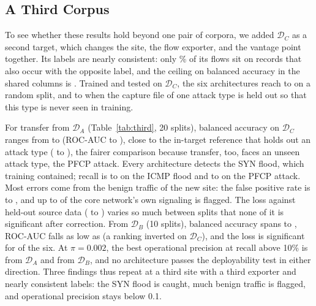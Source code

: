 \documentclass{ieeeaccess}
\newcommand{\DA}{\ensuremath{\mathcal{D}_{A}}}
\newcommand{\DB}{\ensuremath{\mathcal{D}_{B}}}
\newcommand{\DC}{\ensuremath{\mathcal{D}_{C}}}
\begin{document}
\subsection{A Third Corpus}
\label{sec:res:third}

To see whether these results hold beyond one pair of corpora, we added \DC{} as a second target, which changes the site, the flow exporter, and the vantage point together. Its labels are nearly consistent: only \ThConfShare\% of its flows sit on records that also occur with the opposite label, and the ceiling on balanced accuracy in the shared columns is \ThCeilShared{}. Trained and tested on \DC{}, the six architectures reach \ThRefShRandBAmin{} to \ThRefShRandBAmax{} on a random split, and \ThRefShLofoBAmin{} to \ThRefShLofoBAmax{} when the capture file of one attack type is held out so that this type is never seen in training.

For transfer from \DA{} (Table~\ref{tab:third}, 20 splits), balanced accuracy on \DC{} ranges from \ThATgtBAmin{} to \ThATgtBAmax{} (ROC-AUC \ThATgtAUCmin{} to \ThATgtAUCmax), close to the in-target reference that holds out an attack type (\ThRefShLofoBAmin{} to \ThRefShLofoBAmax{}), the fairer comparison because transfer, too, faces an unseen attack type, the PFCP attack. Every architecture detects the SYN flood, which training contained; recall is \ThAIcmpMin{} to \ThAIcmpMax{} on the ICMP flood and \ThAPfcpMin{} to \ThAPfcpMax{} on the PFCP attack. Most errors come from the benign traffic of the new site: the false positive rate is \ThAFPRmin{} to \ThAFPRmax{}, and up to \ThABgFlagMax{} of the core network's own signaling is flagged. The loss against held-out source data (\ThADropMin{} to \ThADropMax{}) varies so much between splits that none of it is significant after correction. From \DB{} (10 splits), balanced accuracy spans \ThBTgtBAmin{} to \ThBTgtBAmax{}, ROC-AUC falls as low as \ThBTgtAUCmin{} (a ranking inverted on \DC{}), and the loss is significant for \ThBSig{} of the six. At $\pi = 0.002$, the best operational precision at recall above 10\% is \ThAPPVbest{} from \DA{} and \ThBPPVbest{} from \DB{}, and no architecture passes the deployability test in either direction. Three findings thus repeat at a third site with a third exporter and nearly consistent labels: the SYN flood is caught, much benign traffic is flagged, and operational precision stays below 0.1.

\begin{table}[t]
\caption{Transfer to the third corpus \DC{} (5G core testbed, NFStream flows~\cite{nugraha2025fivegdatasets}): balanced accuracy on held-out source data and on \DC{}, target ROC-AUC, recall per attack type, and the share of the core's background signaling flagged (Bkg.). Mean over 20 split seeds from \DA{} and 10 from \DB{}, at $\tau=0.5$.}
\label{tab:third}
\centering
\footnotesize

\end{table}
\end{document}

